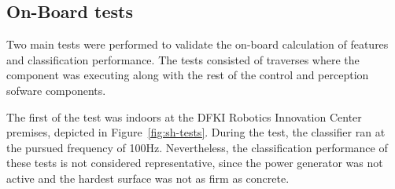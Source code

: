 

\subsection{On-Board tests}

Two main tests were performed to validate the on-board calculation of features and classification performance.
The tests consisted of traverses where the component was executing along with the rest of the control and perception sofware components. 

The first of the test was indoors at the DFKI Robotics Innovation Center premises, depicted in Figure~\ref{fig:sh-tests}.
During the test, the classifier ran at the pursued frequency of 100Hz.
Nevertheless, the classification performance of these tests is not considered representative, since the power generator was not active and the hardest surface was not as firm as concrete. 

